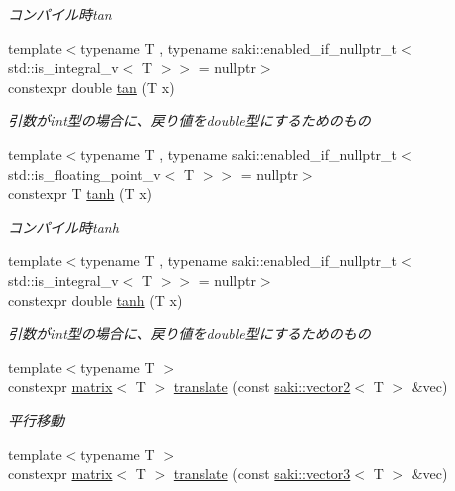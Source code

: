 \begin{DoxyCompactItemize}
\begin{DoxyCompactList}\small\item\em コンパイル時tan \end{DoxyCompactList}\item 
{\footnotesize template$<$typename T , typename saki\+::enabled\+\_\+if\+\_\+nullptr\+\_\+t$<$ std\+::is\+\_\+integral\+\_\+v$<$ T $>$$>$  = nullptr$>$ }\\constexpr double \mbox{\hyperlink{namespacesaki_a52704083849bbdf4ab635cca985c00ae}{tan}} (T x)
\begin{DoxyCompactList}\small\item\em 引数がint型の場合に、戻り値をdouble型にするためのもの \end{DoxyCompactList}\item 
{\footnotesize template$<$typename T , typename saki\+::enabled\+\_\+if\+\_\+nullptr\+\_\+t$<$ std\+::is\+\_\+floating\+\_\+point\+\_\+v$<$ T $>$$>$  = nullptr$>$ }\\constexpr T \mbox{\hyperlink{namespacesaki_af2674216630169ce211f8076492ce14e}{tanh}} (T x)
\begin{DoxyCompactList}\small\item\em コンパイル時tanh \end{DoxyCompactList}\item 
{\footnotesize template$<$typename T , typename saki\+::enabled\+\_\+if\+\_\+nullptr\+\_\+t$<$ std\+::is\+\_\+integral\+\_\+v$<$ T $>$$>$  = nullptr$>$ }\\constexpr double \mbox{\hyperlink{namespacesaki_a5faf83bc9a4a7e981275deba551d2f3f}{tanh}} (T x)
\begin{DoxyCompactList}\small\item\em 引数がint型の場合に、戻り値をdouble型にするためのもの \end{DoxyCompactList}\item 
{\footnotesize template$<$typename T $>$ }\\constexpr \mbox{\hyperlink{classsaki_1_1matrix}{matrix}}$<$ T $>$ \mbox{\hyperlink{namespacesaki_a2311e77a2bed9d914a6b3e8056d6023a}{translate}} (const \mbox{\hyperlink{classsaki_1_1vector2}{saki\+::vector2}}$<$ T $>$ \&vec)
\begin{DoxyCompactList}\small\item\em 平行移動 \end{DoxyCompactList}\item 
{\footnotesize template$<$typename T $>$ }\\constexpr \mbox{\hyperlink{classsaki_1_1matrix}{matrix}}$<$ T $>$ \mbox{\hyperlink{namespacesaki_a492418470fa4dedb2065e7916460f0e0}{translate}} (const \mbox{\hyperlink{classsaki_1_1vector3}{saki\+::vector3}}$<$ T $>$ \&vec)

\end{DoxyCompactItemize}
